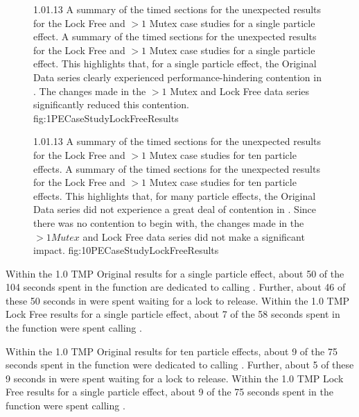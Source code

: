 \begin{figure}
\addtocounter{figure}{-1}

	\vspace{-1.7cm}
	{1.0}{1.13}
	{A summary of the timed sections for the unexpected results for the Lock Free and $> 1$ Mutex case studies for a single particle effect.}
	{A summary of the timed sections for the unexpected results for the Lock Free and $> 1$ Mutex case studies for a single particle effect. This highlights that, for a single particle effect, the Original Data series clearly experienced performance-hindering contention in . The changes made in the $ > 1 $ Mutex and Lock Free data series significantly reduced this contention.}
	{fig:1PECaseStudyLockFreeResults}

	\vspace{-0.6cm}
	{1.0}{1.13}
	{A summary of the timed sections for the unexpected results for the Lock Free and $> 1$ Mutex case studies for ten particle effects.}
	{A summary of the timed sections for the unexpected results for the Lock Free and $> 1$ Mutex case studies for ten particle effects. This highlights that, for many particle effects, the Original Data series did not experience a great deal of contention in . Since there was no contention to begin with, the changes made in the $ > 1 Mutex $ and Lock Free data series did not make a significant impact.}
	{fig:10PECaseStudyLockFreeResults}

\end{figure}

Within the 1.0 TMP Original results for a single particle effect, about 50 of the 104\footnotemark $ $ seconds spent in the function  are dedicated to calling . Further, about 46 of these 50 seconds in  were spent waiting for a lock to release. Within the 1.0 TMP Lock Free results for a single particle effect, about 7 of the 58 seconds spent in the function  were spent calling .


Within the 1.0 TMP Original results for ten particle effects, about 9 of the 75 seconds spent in the function  were dedicated to calling . Further, about 5 of these 9 seconds in  were spent waiting for a lock to release. Within the 1.0 TMP Lock Free results for a single particle effect, about 9 of the 75 seconds spent in the function  were spent calling .

